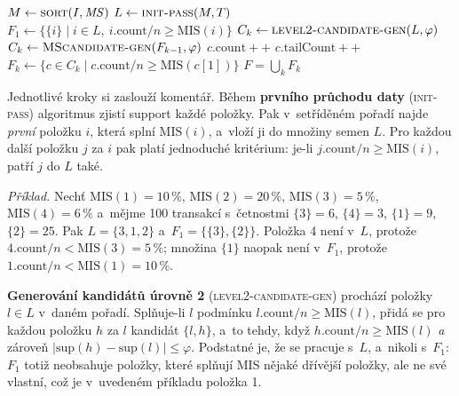 \documentclass[11pt,a4paper]{article}
\theoremstyle{definition}
\begin{document}
\begin{defbox}
\begin{algorithmic}[1]
\State $M\gets \textsc{sort}(I,\mathit{MS})$ 
\State $L\gets \textsc{init-pass}(M,T)$ 
\State $F_1\gets \{\{i\}\mid i\in L,\ i.\mathrm{count}/n\ge \mathrm{MIS}(i)\}$
     \State $C_k\gets \textsc{level2-candidate-gen}(L,\varphi)$
  \Else
     \State $C_k\gets \textsc{MScandidate-gen}(F_{k-1},\varphi)$
  \EndIf
         \State $c.\mathrm{count}{+}{+}$ \EndIf
         \State $c.\mathrm{tailCount}{+}{+}$
            \EndIf
     \EndFor
  \EndFor
  \State $F_k\gets \{c\in C_k\mid c.\mathrm{count}/n\ge \mathrm{MIS}(c[1])\}$
\EndFor
\State \Return $F=\bigcup_k F_k$
\end{algorithmic}
\end{defbox}

Jednotlivé kroky si zaslouží komentář. Během \textbf{prvního průchodu daty}
(\textsc{init-pass}) algoritmus zjistí support každé položky. Pak v~setříděném pořadí najde
\emph{první} položku $i$, která splní $\mathrm{MIS}(i)$, a~vloží ji do množiny semen $L$. Pro
každou další položku $j$ za $i$ pak platí jednoduché kritérium: je-li
$j.\mathrm{count}/n\ge \mathrm{MIS}(i)$, patří $j$ do $L$ také.

\emph{Příklad.} Nechť $\mathrm{MIS}(1)=10\,\%$, $\mathrm{MIS}(2)=20\,\%$,
$\mathrm{MIS}(3)=5\,\%$, $\mathrm{MIS}(4)=6\,\%$ a~mějme 100 transakcí s~četnostmi
$\{3\}=6$, $\{4\}=3$, $\{1\}=9$, $\{2\}=25$. Pak $L=\{3,1,2\}$ a~$F_1=\{\{3\},\{2\}\}$.
Položka 4 není v~$L$, protože $4.\mathrm{count}/n<\mathrm{MIS}(3)=5\,\%$; množina $\{1\}$
naopak není v~$F_1$, protože $1.\mathrm{count}/n<\mathrm{MIS}(1)=10\,\%$.

\textbf{Generování kandidátů úrovně 2} (\textsc{level2-candidate-gen}) prochází položky
$l\in L$ v~daném pořadí. Splňuje-li $l$ podmínku $l.\mathrm{count}/n\ge\mathrm{MIS}(l)$,
přidá se pro každou položku $h$ za $l$ kandidát $\{l,h\}$, a~to tehdy, když
$h.\mathrm{count}/n\ge\mathrm{MIS}(l)$ \emph{a} zároveň
$|\mathrm{sup}(h)-\mathrm{sup}(l)|\le\varphi$. Podstatné je, že se pracuje s~$L$, a~nikoli
s~$F_1$: $F_1$ totiž neobsahuje položky, které splňují MIS nějaké dřívější položky, ale ne
své vlastní, což je v~uvedeném příkladu položka 1.
\end{document}
